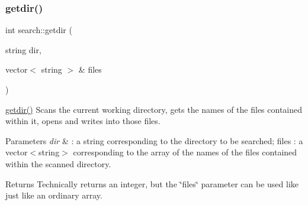 \subsubsection{\texorpdfstring{getdir()}{getdir()}\hspace{0.1cm}{\footnotesize\ttfamily [2/2]}}
{\footnotesize\ttfamily int search\+::getdir (\begin{DoxyParamCaption}\item[{string}]{dir,  }\item[{vector$<$ string $>$ \&}]{files }\end{DoxyParamCaption})}

\hyperlink{namespacesearch_a2f52a0545d237d7a566fcaa887bdc784}{getdir()} Scans the current working directory, gets the names of the files contained within it, opens and writes into those files. 
\begin{DoxyParams}{Parameters}
{\em dir} & \+: a string corresponding to the directory to be searched; files \+: a vector$<$string$>$ corresponding to the array of the names of the files contained within the scanned directory. \\
\hline
\end{DoxyParams}
\begin{DoxyReturn}{Returns}
Technically returns an integer, but the \char`\"{}files\char`\"{} parameter can be used like just like an ordinary array. 
\end{DoxyReturn}
